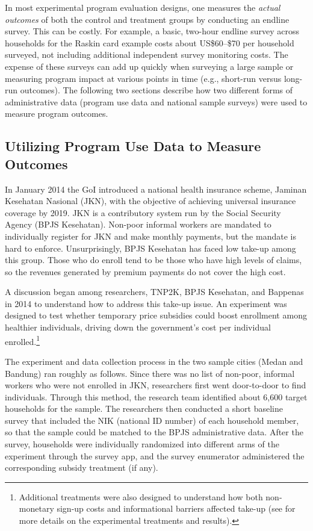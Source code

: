 In most experimental program evaluation designs, one measures the \emph{actual outcomes} of both the control and treatment groups by conducting an endline survey. This can be costly. For example, a basic, two-hour endline survey across households for the Raskin card example costs about US\$60--\$70 per household surveyed, not including additional independent survey monitoring costs. The expense of these surveys can add up quickly when surveying a large sample or measuring program impact at various points in time (e.g., short-run versus long-run outcomes). The following two sections describe how two different forms of administrative data (program use data and national sample surveys) were used to measure program outcomes.

\hypertarget{utilizing-program-use-data-to-measure-outcomes}{%
\subsection{Utilizing Program Use Data to Measure Outcomes}\label{utilizing-program-use-data-to-measure-outcomes}}

In January 2014 the GoI introduced a national health insurance scheme, Jaminan Kesehatan Nasional (JKN), with the objective of achieving universal insurance coverage by 2019. JKN is a contributory system run by the Social Security Agency (BPJS Kesehatan). Non-poor informal workers are mandated to individually register for JKN and make monthly payments, but the mandate is hard to enforce. Unsurprisingly, BPJS Kesehatan has faced low take-up among this group. Those who do enroll tend to be those who have high levels of claims, so the revenues generated by premium payments do not cover the high cost.

A discussion began among researchers, TNP2K, BPJS Kesehatan, and Bappenas in 2014 to understand how to address this take-up issue. An experiment was designed to test whether temporary price subsidies could boost enrollment among healthier individuals, driving down the government's cost per individual enrolled.\footnote{Additional treatments were also designed to understand how both non-monetary sign-up costs and informational barriers affected take-up (see \citet{banerjee2019} for more details on the experimental treatments and results).}

The experiment and data collection process in the two sample cities (Medan and Bandung) ran roughly as follows. Since there was no list of non-poor, informal workers who were not enrolled in JKN, researchers first went door-to-door to find individuals. Through this method, the research team identified about 6,600 target households for the sample. The researchers then conducted a short baseline survey that included the NIK (national ID number) of each household member, so that the sample could be matched to the BPJS administrative data. After the survey, households were individually randomized into different arms of the experiment through the survey app, and the survey enumerator administered the corresponding subsidy treatment (if any).


